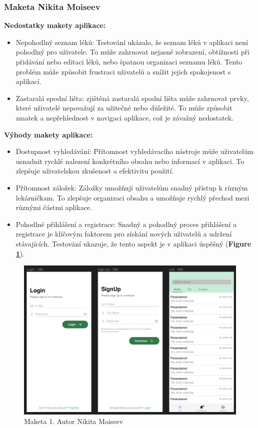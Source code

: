 \documentclass[a4paper, 11pt]{article}
\begin{document}
   \subsubsection{Maketa Nikita Moiseev}
\noindent \textbf{Nedostatky makety aplikace:}
   \begin{itemize}
       \item Nepohodlný seznam léků: Testování ukázalo, že seznam léků v aplikaci není pohodlný pro uživatele. To může zahrnovat nejasné zobrazení, obtížnosti při přidávání nebo editaci léků, nebo špatnou organizaci seznamu léků. Tento problém může způsobit frustraci uživatelů a snížit jejich spokojenost s aplikací.
       \item Zastaralá spodní lišta: zjištěná zastaralá spodní lišta může zahrnovat prvky, které uživatelé nepovažují za užitečné nebo důležité. To může způsobit zmatek a nepřehlednost v navigaci aplikace, což je závažný nedostatek.
   \end{itemize}
   \textbf{Výhody  makety aplikace:}
   \begin{itemize}
       \item Dostupnost vyhledávání: Přítomnost vyhledávacího nástroje může uživatelům usnadnit rychlé nalezení konkrétního obsahu nebo informací v aplikaci. To zlepšuje uživatelskou zkušenost a efektivitu použití.
       \item Přítomnost záložek: Záložky umožňují uživatelům snadný přístup k různým lekárničkam. To zlepšuje organizaci obsahu a umožňuje rychlý přechod mezi různými částmi aplikace.
       \item Pohodlné přihlášení a registrace: Snadný a pohodlný proces přihlášení a registrace je klíčovým faktorem pro získání nových uživatelů a udržení stávajících. Testování ukazuje, že tento aspekt je v aplikaci úspěšný (\textbf {Figure \ref{figure:maketa1}}).
   \end{itemize}
   \begin{figure}[!ht]
		\centering	\includegraphics[width=\textwidth,height=\textheight,keepaspectratio]{Maketa_NM.png}
		\caption{Maketa 1. Autor Nikita Moiseev}
		\label{figure:maketa1}
	\end{figure}
\FloatBarrier
\end{document}
